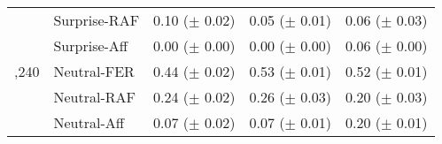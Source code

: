 \documentclass[a4paper, conference]{IEEEtran}
\begin{document}
\begin{table}[htbp]
\begin{center}
\begin{tabular}{>{\raggedleft\arraybackslash}p{0.7cm}p{1.82cm}p{1.55cm}p{1.55cm}p{1.55cm}@{}}
			    & Surprise-RAF & 0.10 ($\pm$ 0.02) & 0.05 ($\pm$ 0.01) & 0.06 ($\pm$ 0.03) \\
			    & Surprise-Aff & 0.00 ($\pm$ 0.00) & 0.00 ($\pm$ 0.00) & 0.06 ($\pm$ 0.00) \\
			\hline %
			1,240 & Neutral-FER & 0.44 ($\pm$ 0.02) & 0.53 ($\pm$ 0.01) & 0.52 ($\pm$ 0.01) \\
			      & Neutral-RAF & 0.24 ($\pm$ 0.02) & 0.26 ($\pm$ 0.03) & 0.20 ($\pm$ 0.03) \\
			      & Neutral-Aff & 0.07 ($\pm$ 0.02) & 0.07 ($\pm$ 0.01) & 0.20 ($\pm$ 0.01) \\
			\hline
			\hline
		\end{tabular}
		\label{f1_scores_FER}
	\end{center}
\end{table}
\end{document}
